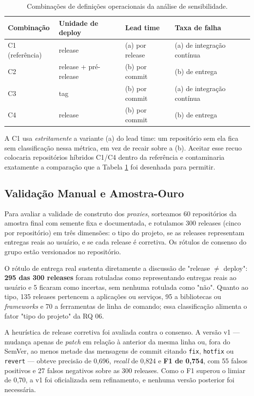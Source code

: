 \documentclass[12pt]{article}
\begin{document}
\begin{table}[ht]
\centering
\caption{Combinações de definições operacionais da análise de sensibilidade.}
\label{tab:combinacoes}
\footnotesize
\begin{tabular}{llll}
\toprule
\textbf{Combinação} & \textbf{Unidade de deploy} & \textbf{Lead time} & \textbf{Taxa de falha} \\
\midrule
C1 (referência) & release & (a) por release & (a) de integração contínua \\
C2 & release + pré-release & (b) por commit & (b) de entrega \\
C3 & tag & (b) por commit & (a) de integração contínua \\
C4 & release & (b) por commit & (b) de entrega \\
\bottomrule
\end{tabular}
\end{table}

A C1 usa \emph{estritamente} a variante (a) do lead time: um repositório sem ela fica sem
classificação nessa métrica, em vez de recair sobre a (b). Aceitar esse recuo colocaria
repositórios híbridos C1/C4 dentro da referência e contaminaria exatamente a comparação que
a Tabela \ref{tab:combinacoes} foi desenhada para permitir.

\subsection{Validação Manual e Amostra-Ouro}

Para avaliar a validade de construto dos \emph{proxies}, sorteamos 60 repositórios da
amostra final com semente fixa e documentada, e rotulamos 300 releases (cinco por
repositório) em três dimensões: o tipo do projeto, se as releases representam entregas
reais ao usuário, e se cada release é corretiva. Os rótulos de consenso do grupo estão
versionados no repositório.

O rótulo de entrega real sustenta diretamente a discussão de "release $\neq$ deploy":
\textbf{295 das 300 releases} foram rotuladas como representando entregas reais ao usuário
e 5 ficaram como incertas, sem nenhuma rotulada como "não". Quanto ao tipo, 135 releases
pertencem a aplicações ou serviços, 95 a bibliotecas ou \emph{frameworks} e 70 a
ferramentas de linha de comando; essa classificação alimenta o fator "tipo do projeto" da
RQ 06.

A heurística de release corretiva foi avaliada contra o consenso. A versão v1 --- mudança
apenas de \emph{patch} em relação à anterior da mesma linha ou, fora do SemVer, ao menos
metade das mensagens de commit citando \texttt{fix}, \texttt{hotfix} ou \texttt{revert} ---
obteve precisão de 0,696, \emph{recall} de 0,824 e \textbf{F1 de 0,754}, com 55 falsos
positivos e 27 falsos negativos sobre as 300 releases. Como o F1 superou o limiar de 0,70,
a v1 foi oficializada sem refinamento, e nenhuma versão posterior foi necessária.
\end{document}
